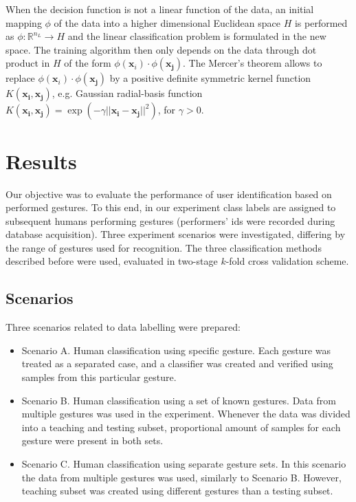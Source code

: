 \documentclass[]{article}
\newcommand{\R}{\mathbb{R}}
\begin{document}
When the decision function is not a linear function of the data, an initial
mapping $\phi$ of the data into a higher dimensional Euclidean space $H$ is
performed as $\phi:\R^{n_L} \rightarrow H$ and the linear classification problem
is formulated in the new space. The training algorithm then only depends on the
data through dot product in $H$ of the form $\phi(\mathbf{x}_i)\cdot
\phi(\mathbf{x_j})$.  The Mercer's theorem \cite{Burges:1998} allows to
replace $\phi(\mathbf{x}_i)\cdot \phi(\mathbf{x_j})$ by a positive definite
symmetric kernel function $K(\mathbf{x_i},\mathbf{x_j})$, e.g. Gaussian
radial-basis function $K(\mathbf{x_i},\mathbf{x_j}) =
\exp(-\gamma||\mathbf{x_i}-\mathbf{x_j}||^2)$, for $\gamma>0$.

\section{Results}
Our objective was to evaluate the performance of user identification based on
performed gestures. To this end, in our experiment class labels are assigned to
subsequent humans performing gestures (performers' ids were recorded during
database acquisition). Three experiment scenarios were investigated, differing
by the range of gestures used for recognition. The three  classification methods
described before were used, evaluated in two-stage $k$-fold cross validation
scheme.

\subsection{Scenarios}
Three scenarios related to data labelling were prepared:
\begin{itemize}
\item Scenario A. Human classification using specific gesture. Each gesture was
treated as a separated case, and a classifier was created and verified using
samples from this particular gesture.
\item Scenario B. Human classification using a set of known gestures. Data from
multiple gestures was used in the experiment. Whenever the data was divided into
a teaching and testing subset, proportional amount of samples for each gesture
were present in both sets.
\item Scenario C. Human classification using separate gesture sets. In this
scenario the data from multiple gestures was used, similarly to Scenario B.
However, teaching subset was created using different gestures than a testing
subset.
\end{itemize}
\end{document}

